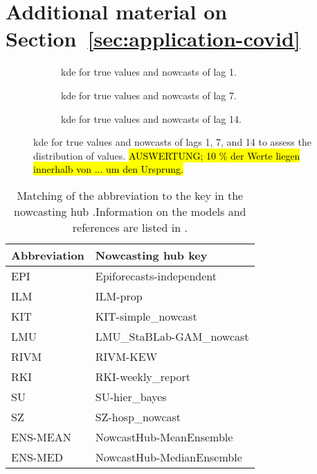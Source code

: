 \section{Additional material on Section~\ref{sec:application-covid}}\label{sec:appendix-application-covid}


\begin{figure}
    \centering
    \begin{subfigure}[t]{.31\textwidth}
        \caption{\ac{kde} for true values and nowcasts of lag 1.}
    \end{subfigure}\hspace{0.01\textwidth}
    \begin{subfigure}[t]{.31\textwidth}
        \caption{\ac{kde} for true values and nowcasts of lag 7.}
    \end{subfigure}\hspace{0.01\textwidth}
    \begin{subfigure}[t]{.31\textwidth}
        \caption{\ac{kde} for true values and nowcasts of lag 14.}
    \end{subfigure}
    \caption{\Ac{kde} for true values and nowcasts of lags 1, 7, and 14 to assess the distribution of values. \hl{AUSWERTUNG; 10 \% der Werte liegen innerhalb von ... um den Ursprung.}}
    \label{fig:app-covid-kde}
\end{figure}


\begin{table}
    \centering
    \begin{tabular}{l X}
        \toprule
        Abbreviation & Nowcasting hub key \\
        \midrule
        EPI & Epiforecasts-independent \\
        ILM & ILM-prop \\
        KIT & KIT-simple\_nowcast \\
        LMU & LMU\_StaBLab-GAM\_nowcast \\
        RIVM & RIVM-KEW \\
        RKI & RKI-weekly\_report \\
        SU & SU-hier\_bayes \\
        SZ & SZ-hosp\_nowcast\\
        ENS-MEAN & NowcastHub-MeanEnsemble\\
        ENS-MED & NowcastHub-MedianEnsemble\\
        \bottomrule
    \end{tabular}
    \caption{Matching of the abbreviation to the key in the nowcasting hub .Information on the models and references are listed in \textcite[][Table 1]{Wolffram2023}.}
    \label{tab:app-covid-models}
\end{table}